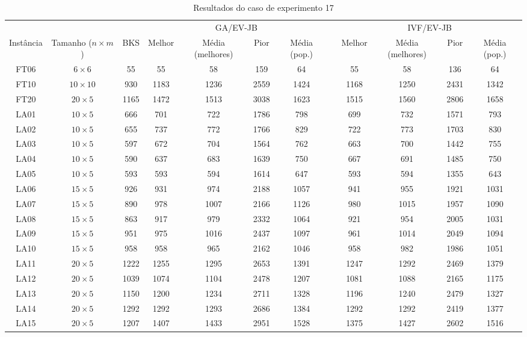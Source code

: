 \begin{sidewaystable}
\caption{Resultados do caso de experimento 17}
\centering
\label{experimento17}
\begin{tabular}{cccccccccccc}
\toprule
& & & \multicolumn{4}{c}{GA/EV-JB} & & \multicolumn{4}{c}{IVF/EV-JB} \\
\cmidrule(c){4-7}
\cmidrule(c){9-12}
Inst\^{a}ncia & Tamanho ($n \times m$) & BKS & Melhor & M\'{e}dia (melhores) & Pior & M\'{e}dia (pop.) & & Melhor & M\'{e}dia (melhores) & Pior & M\'{e}dia (pop.) \\
\midrule
FT06 & $6 \times 6$ & 55 & 55 & 58 & 159 & 64 & & 55 & 58 & 136 & 64 \\
FT10 & $10 \times 10$ & 930 & 1183 & 1236 & 2559 & 1424 & & 1168 & 1250 & 2431 & 1342 \\
FT20 & $20 \times 5$ & 1165 & 1472 & 1513 & 3038 & 1623 & & 1515 & 1560 & 2806 & 1658 \\
LA01 & $10 \times 5$ & 666 & 701 & 722 & 1786 & 798 & & 699 & 732 & 1571 & 793 \\
LA02 & $10 \times 5$ & 655 & 737 & 772 & 1766 & 829 & & 722 & 773 & 1703 & 830 \\
LA03 & $10 \times 5$ & 597 & 672 & 704 & 1564 & 762 & & 663 & 700 & 1442 & 755 \\
LA04 & $10 \times 5$ & 590 & 637 & 683 & 1639 & 750 & & 667 & 691 & 1485 & 750 \\
LA05 & $10 \times 5$ & 593 & 593 & 594 & 1614 & 647 & & 593 & 594 & 1355 & 643 \\
LA06 & $15 \times 5$ & 926 & 931 & 974 & 2188 & 1057 & & 941 & 955 & 1921 & 1031 \\
LA07 & $15 \times 5$ & 890 & 978 & 1007 & 2166 & 1126 & & 980 & 1015 & 1957 & 1090 \\
LA08 & $15 \times 5$ & 863 & 917 & 979 & 2332 & 1064 & & 921 & 954 & 2005 & 1031 \\
LA09 & $15 \times 5$ & 951 & 975 & 1016 & 2437 & 1097 & & 961 & 1014 & 2049 & 1094 \\
LA10 & $15 \times 5$ & 958 & 958 & 965 & 2162 & 1046 & & 958 & 982 & 1986 & 1051 \\
LA11 & $20 \times 5$ & 1222 & 1255 & 1295 & 2653 & 1391 & & 1247 & 1292 & 2469 & 1379 \\
LA12 & $20 \times 5$ & 1039 & 1074 & 1104 & 2478 & 1207 & & 1081 & 1088 & 2165 & 1175 \\
LA13 & $20 \times 5$ & 1150 & 1200 & 1234 & 2711 & 1328 & & 1196 & 1240 & 2479 & 1327 \\
LA14 & $20 \times 5$ & 1292 & 1292 & 1293 & 2686 & 1384 & & 1292 & 1292 & 2419 & 1377 \\
LA15 & $20 \times 5$ & 1207 & 1407 & 1433 & 2951 & 1528 & & 1375 & 1427 & 2602 & 1516 \\
\bottomrule
\end{tabular}
\end{sidewaystable}
